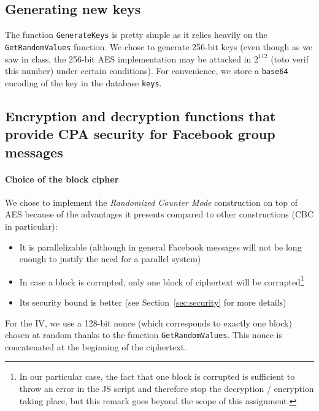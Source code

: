 \documentclass[10pt,twocolumn]{article}
\begin{document}
\subsection{Generating new keys}
The function \texttt{GenerateKeys} is pretty simple as it relies heavily on the \texttt{GetRandomValues} function. We chose to generate 256-bit keys (even though as we saw in class, the 256-bit AES implementation may be attacked in $2^{112}$ (toto verif this number) under certain conditions). For convenience, we store a \texttt{base64} encoding of the key in the database \texttt{keys}.



\subsection{Encryption and decryption functions that provide CPA security for Facebook group messages}\label{encryption-decryption}

\paragraph{Choice of the block cipher}
We chose to implement the \emph{Randomized Counter Mode} construction on top of AES because of the advantages it presents compared to other constructions (CBC in particular):
\begin{itemize}
\item It is parallelizable (although in general Facebook messages will not be long enough to justify the need for a parallel system)
\item In case a block is corrupted, only one block of ciphertext will be corrupted\footnote{In our particular case, the fact that one block is corrupted is sufficient to throw an error in the JS script and therefore stop the decryption / encryption taking place, but this remark goes beyond the scope of this assignment.}
\item Its security bound is better (see Section~\ref{sec:security} for more details)
\end{itemize}
For the IV, we use a 128-bit nonce (which corresponds to exactly one block) chosen at random thanks to the function \texttt{GetRandomValues}. This nonce is concatenated at the beginning of the ciphertext.
\end{document}
